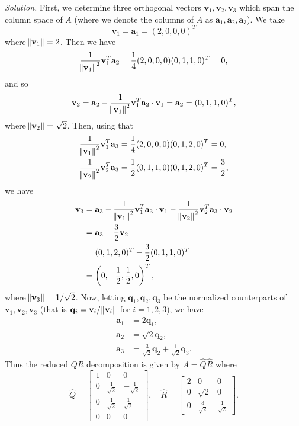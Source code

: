 \documentclass{article}
\def\*#1{\mathbf{#1}}
\begin{document}
\textit{Solution.}
First, we determine three orthogonal vectors $\*v_1, \*v_2, \*v_3$ which
span the column space of $A$ (where we denote the columns of $A$ as
$\*a_1, \*a_2, \*a_3$). We take
%
\begin{equation*}
    \*v_1 = \*a_1 = (2, 0, 0, 0)^T
\end{equation*}
%
where $\enVert{\*v_1} = 2$. Then we have
%
\begin{equation*}
    \frac{1}{\enVert{\*v_1}^2} \*v_1^T \*a_2
    = \frac{1}{4} (2, 0, 0, 0) (0, 1, 1, 0)^T = 0
    ,
\end{equation*}
%
and so
%
\begin{equation*}
    \*v_2 = \*a_2 - \frac{1}{\enVert{\*v_1}^2} \*v_1^T \*a_2 \cdot \*v_1
        = \*a_2
        = (0, 1, 1, 0)^T
        ,
\end{equation*}
%
where $\enVert{\*v_2} = \sqrt{2}$. Then, using that
%
\begin{align*}
    \frac{1}{\enVert{\*v_1}^2} \*v_1^T \*a_3
    &= \frac{1}{4} (2, 0, 0, 0) (0, 1, 2, 0)^T = 0, \\
    \frac{1}{\enVert{\*v_2}^2} \*v_2^T \*a_3
    &= \frac{1}{2} (0, 1, 1, 0) (0, 1, 2, 0)^T = \frac{3}{2},
\end{align*}
%
we have
%
\begin{align*}
    \*v_3
        &= \*a_3
            - \frac{1}{\enVert{\*v_1}^2} \*v_1^T \*a_3 \cdot \*v_1
            - \frac{1}{\enVert{\*v_2}^2} \*v_2^T \*a_3 \cdot \*v_2
            \\
        &= \*a_3 - \frac{3}{2} \*v_2
        \\
        &= (0, 1, 2, 0)^T - \frac{3}{2} (0, 1, 1, 0)^T
        \\
        &= \del{0, - \frac{1}{2}, \frac{1}{2}, 0}^T
        ,
\end{align*}
%
where $\enVert{\*v_3} = 1 / \sqrt{2}$.
%
Now, letting $\*q_1, \*q_2, \*q_3$ be the normalized counterparts of $\*v_1, \*v_2, \*v_3$
(that is $\*q_i = \*v_i / \enVert{\*v_i}$ for $i = 1, 2, 3$), we have
%
\begin{align*}
    \*a_1 &= 2 \*q_1, \\
    \*a_2 &= \sqrt{2} \*q_2, \\
    \*a_3 &= \frac{3}{\sqrt{2}} \*q_2 + \frac{1}{\sqrt{2}} \*q_3.
\end{align*}
%
Thus the reduced $QR$ decomposition is given by $A = \widehat{Q} \widehat{R}$ where
%
\begin{equation*}
    \widehat{Q} =
    \begin{bmatrix}
        1 & 0 & 0 \\
        0 & \frac{1}{\sqrt{2}} & - \frac{1}{\sqrt{2}} \\
        0 & \frac{1}{\sqrt{2}} & \frac{1}{\sqrt{2}} \\
        0 & 0 & 0
    \end{bmatrix},
    \quad
    \widehat{R} =
    \begin{bmatrix}
        2 & 0 & 0 \\
        0 & \sqrt{2} & 0 \\
        0 & \frac{3}{\sqrt{2}} & \frac{1}{\sqrt{2}}
    \end{bmatrix}
    .
\end{equation*}
\end{document}

